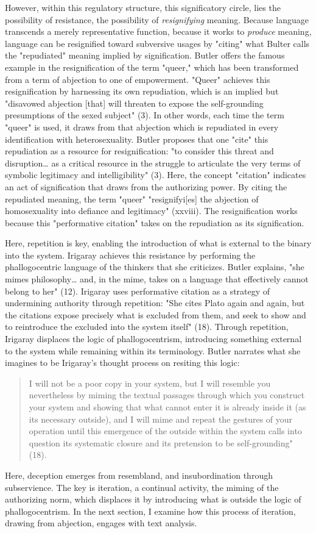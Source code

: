 \documentclass[11pt]{article}
\begin{document}
However, within this regulatory structure, this significatory circle,
lies the possibility of resistance, the possibility of \emph{resignifying}
meaning. Because language transcends a merely representative function,
because it works to \emph{produce} meaning, language can be resignified
toward subversive usages by "citing" what Bulter calls the
"repudiated" meaning implied by signification. Butler offers the
famous example in the resignification of the term "queer," which has
been transformed from a term of abjection to one of
empowerment. "Queer" achieves this resignification by harnessing its
own repudiation, which is an implied but "disavowed abjection [that]
will threaten to expose the self-grounding presumptions of the sexed
subject" (3). In other words, each time the term "queer" is used, it
draws from that abjection which is repudiated in every identification
with heterosexuality. Butler proposes that one "cite" this repudiation
as a resource for resignification: "to consider this threat and
disruption\ldots{} as a critical resource in the struggle to articulate the
very terms of symbolic legitimacy and intelligibility" (3). Here, the
concept "citation" indicates an act of signification that draws from
the authorizing power. By citing the repudiated meaning, the term
"queer" "resignifyi[es] the abjection of homosexuality into defiance
and legitimacy" (xxviii). The resignification works because this
"performative citation" takes on the repudiation as its signification.

Here, repetition is key, enabling the introduction of what is external
to the binary into the system. Irigaray achieves this resistance by
performing the phallogocentric language of the thinkers that she
criticizes. Butler explains, "she mimes philosophy\ldots{} and, in the
mime, takes on a language that effectively cannot belong to her"
(12). Irigaray uses performative citation as a strategy of undermining
authority through repetition: "She cites Plato again and again, but
the citations expose precisely what is excluded from them, and seek to
show and to reintroduce the excluded into the system itself"
(18). Through repetition, Irigaray displaces the logic of
phallogocentrism, introducing something external to the system while
remaining within its terminology. Butler narrates what she imagines to
be Irigaray's thought process on resiting this logic:
\begin{quote}
I will not be a poor copy in your system, but I will resemble you
nevertheless by miming the textual passages through which you
construct your system and showing that what cannot enter it is already
inside it (as its necessary outside), and I will mime and repeat the
gestures of your operation until this emergence of the outside within
the system calls into question its systematic closure and its
pretension to be self-grounding" (18).
\end{quote}
Here, deception emerges from resembland, and insubordination through
subservience. The key is iteration, a continual activity, the miming
of the authorizing norm, which displaces it by introducing what is
outside the logic of phallogocentrism. In the next section, I examine
how this process of iteration, drawing from abjection, engages with
text analysis.
\end{document}
